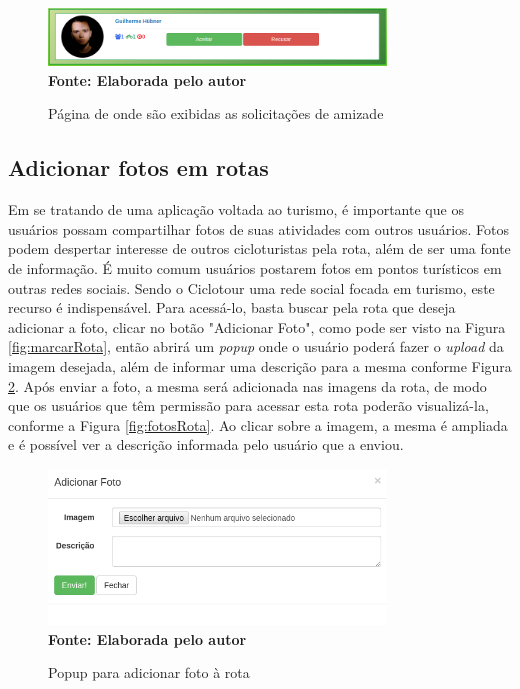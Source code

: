 \begin{figure}[!ht]
	\centering	
	\caption[\hspace{0.1cm} Solicitações de amizade.]
	{Página de onde são exibidas as solicitações de amizade}
	  \vspace{-0.4cm}
	\includegraphics[width=0.8\textwidth]{figuras/solicitacaoAmizade.png}
	 \vspace{0cm}
	\\\textbf{\footnotesize Fonte: Elaborada pelo autor}
	\label{fig:solicitacaoAmizade}
\end{figure}

\subsection{Adicionar fotos em rotas}
Em se tratando de uma aplicação voltada ao turismo, é importante que os usuários possam compartilhar 
fotos de suas atividades com outros usuários. Fotos 
podem despertar interesse de outros cicloturistas pela rota, além de ser uma fonte de informação. É muito comum usuários postarem fotos em pontos 
turísticos em outras redes sociais. Sendo o Ciclotour uma rede social focada em turismo, este recurso é indispensável. Para acessá-lo, basta buscar
pela rota que deseja adicionar a foto, clicar no botão "Adicionar Foto", como pode ser visto na Figura \ref{fig:marcarRota}, então abrirá um 
\textit{popup} onde o usuário poderá fazer o \textit{upload} da imagem desejada, além de informar uma descrição para a mesma conforme Figura 
\ref{fig:adicionarFoto}. Após enviar a foto, a mesma será adicionada nas imagens da rota, de modo que os usuários que têm permissão para acessar 
esta rota poderão visualizá-la, conforme a Figura \ref{fig:fotosRota}. Ao clicar sobre a imagem, a mesma é ampliada e é possível ver a descrição 
informada pelo usuário que a enviou.

\begin{figure}[!ht]
	\centering	
	\caption[\hspace{0.1cm} Adicionar Foto.]
	{Popup para adicionar foto à rota}
	  \vspace{-0.4cm}
	\includegraphics[width=0.8\textwidth]{figuras/adicionarFoto.png}
	 \vspace{0cm}
	\\\textbf{\footnotesize Fonte: Elaborada pelo autor}
	\label{fig:adicionarFoto}
\end{figure}

